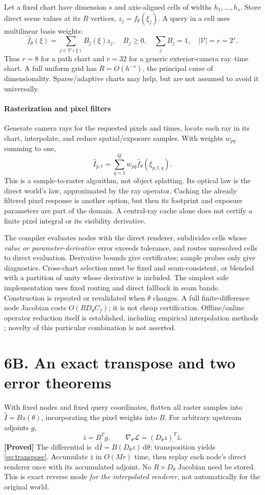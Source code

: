 \documentclass[11pt,letterpaper]{article}
\newcommand{\dd}{\,\mathrm d}\newcommand{\supp}{\operatorname{supp}}
\newcommand{\status}[1]{\textsf{\textbf{[#1]}}}
\newcommand{\pagehead}[2]{\newpage\section*{#1}\vspace{-3pt}{\small\sffamily\color{ink}#2}\par\vspace{4pt}}
\newcommand{\mini}[1]{\paragraph{#1}}
\begin{document}
Let a fixed chart have dimension $s$ and axis-aligned cells of widths $h_1,\ldots,h_s$. Store direct scene values at its $R$ vertices, $z_j=f_\theta(\xi_j)$. A query in a cell uses multilinear basis weights:
\begin{equation}
 \widehat f_\theta(\xi)=\sum_{j\in\mathcal V(\xi)}B_j(\xi)z_j,
 \quad B_j\ge0,\quad\sum_j B_j=1,\quad |\mathcal V|=r=2^s. \label{eq:operator}
\end{equation}
Thus $r=8$ for a path chart and $r=32$ for a generic exterior-camera ray--time chart. A full uniform grid has $R=O(h^{-s})$, the principal curse of dimensionality. Sparse/adaptive charts may help, but are not assumed to avoid it universally.

\mini{Rasterization and pixel filters}
Generate camera rays for the requested pixels and times, locate each ray in its chart, interpolate, and reduce spatial/exposure samples. With weights $w_{pq}$ summing to one,
\begin{equation}
 \widehat I_{p,t}=\sum_{q=1}^{Q}w_{pq}\widehat f_\theta(\xi_{p,t,q}). \label{eq:pixelfilter}
\end{equation}
This is a sample-to-raster algorithm, not object splatting. Its optical law is the direct world's law, approximated by the ray operator. Caching the already filtered pixel response is another option, but then its footprint and exposure parameters are part of the domain. A central-ray cache alone does not certify a finite pixel integral or its visibility derivative.

The compiler evaluates nodes with the direct renderer, subdivides cells whose \emph{value or parameter-derivative} error exceeds tolerance, and routes unresolved cells to direct evaluation. Derivative bounds give certificates; sample probes only give diagnostics. Cross-chart selection must be fixed and seam-consistent, or blended with a partition of unity whose derivative is included. The simplest safe implementation uses fixed routing and direct fallback in seam bands. Construction is repeated or revalidated when $\theta$ changes. A full finite-difference node Jacobian costs $O(RD_\theta C_f)$; it is not cheap certification. Offline/online operator reduction itself is established, including empirical interpolation methods \cite{eim}; novelty of this particular combination is not asserted.

\pagehead{6B. An exact transpose and two error theorems}{DIRECTION E / THE MAIN FORWARD--BACKWARD REUSE RESULT}
With fixed nodes and fixed query coordinates, flatten all raster samples into $\widehat I=Bz(\theta)$, incorporating the pixel weights into $B$. For arbitrary upstream adjoints $g$,
\begin{equation}
 \bar z=B^Tg,\qquad \nabla_\theta\mathcal L=(D_\theta z)^T\bar z. \label{eq:transpose}
\end{equation}
\status{Proved} The differential is $\dd\widehat I=B(D_\theta z)\dd\theta$; transposition yields \eqref{eq:transpose}. Accumulate $\bar z$ in $O(Mr)$ time, then replay each node's direct renderer once with its accumulated adjoint. No $R\times D_\theta$ Jacobian need be stored. This is exact reverse mode \emph{for the interpolated renderer}, not automatically for the original world.
\end{document}
